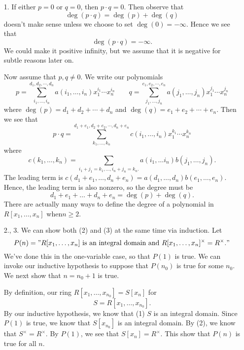 \begin{prf}
    \begin{itemize}
        \item[1.] If either $p = 0$ or $q = 0$, then $p \cdot q =
        0$. Then observe that 
        \[
            \deg(p \cdot q) = \deg(p) + \deg(q)
        \]
        doesn't make sense unless  we choose  to set $\deg(0) =
        -\infty$. Hence we see that
        \[
            \deg(p \cdot q) = -\infty.   
        \]
        We could make it positive infinity, but we assume that it
        is negative for subtle reasons later on. 

        Now assume that $p, q \ne 0$. We write our polynomials 
        \[
            p = \sum_{i_1, \dots, i_n}^{d_1, d_2, \cdots, d_n}a(i_1, \dots, i_n)x_1^{i_1}\cdots x_n^{i_n}
            \qquad 
            q = \sum_{j_1, \dots, j_n}^{e_1, e_2, \cdots, e_n}a(j_1, \dots, j_n)x_1^{j_1}\cdots x_n^{j_n}
        \]
        where $\deg(p) = d_1 + d_2 + \cdots + d_n$ and $\deg(q) =
        e_1 + e_2 + \cdots + e_n$. Then we see that 
        \[
            p \cdot q  
            = 
            \sum_{k_1, \dots, k_n}^{d_1 + e_1, d_2 + e_2, \cdots, d_n + e_n}c(i_1, \dots, i_n)x_1^{k_1}\cdots x_n^{k_n}  
        \]
        where 
        \[
            c(k_1, \dots, k_n) 
            = 
            \sum_{i_1+j_1 = k_1, \dots, i_n+j_n = k_n.} a(i_1,  \dots i_n)b(j_1, \dots, j_n).
        \]
        The leading term is  $c(d_1 + e_1, \dots, d_n + e_n) =
        a(d_1, \dots, d_n )b(e_1, \dots, e_n)$. Hence, the
        leading term is also nonzero, so the degree must be 
        \[
            d_1 + e_1 +  \dots + d_n + e_n = \deg(p) + \deg(q).  
        \]
        There are actually many ways to define the degree of a
        polynomial in $R[x_1, \dots, x_n]$ when$n \ge 2$. 

        \item[2., 3.] We can show both (2)  and (3) at the same
        time via induction. Let 
        \[
            P(n) = "R[x_1, \dots, x_n] \text{ is an integral domain and } R[x_1, \dots, x_n]^{\times} = R^{\times}."
        \] 
        We've done this in the one-variable case, so that $P(1)$
        is true. We can invoke our inductive hypothesis to suppose
        that $P(n_0)$ is true for some $n_0$. We next show that $n
        = n_0 + 1$ is true. 

        By definition, our ring $R[x_1, \dots, x_{n_0}] = S[x_n]$ for 
        \[
            S = R[x_1, \dots, x_{n_0}].
        \]
        By our inductive hypothesis, we know that (1)  $S$ is an
        integral domain. Since $P(1)$ is true, we know that
        $S[x_{n_0}]$ is an integral domain. By (2), we know that
        $S^\times = R^\times$. By $P(1)$, we see that $S[x_n] =
        R^\times$. This show that $P(n)$ is true for all $n$.
    \end{itemize}
\end{prf}

